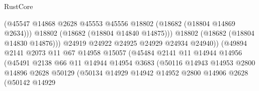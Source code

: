 \begin{lexlean}{RustCore}
\begin{coremodule}
                                            (@45547
                                              @14868
                                              @2628
                                              @45553
                                              @45556
                                              @18802
                                              (@18682 (@18804 @14869 @2634)))
                                            @18802
                                            (@18682 (@18804 @14840 @14875)))
                                          @18802
                                          (@18682 (@18804 @14830 @14876)))
                                        @24919
                                        @24922
                                        @24925
                                        @24929
                                        @24934
                                        @24940))
                                    (@49894
                                      @2141
                                      @2073
                                      @11
                                      @67
                                      @14958
                                      @15057
                                      (@45484
                                        @2141
                                        @11
                                        @14944
                                        @14956
                                        (@45491
                                          @2138
                                          @66
                                          @11
                                          @14944
                                          @14954
                                          @3683
                                          (@50116
                                            @14943
                                            @14953
                                            @2800
                                            @14896
                                            @2628
                                            @50129
                                            (@50134
                                              @14929
                                              @14942
                                              @14952
                                              @2800
                                              @14906
                                              @2628
                                              (@50142
                                                @14929

\end{coremodule}
\end{lexlean}
